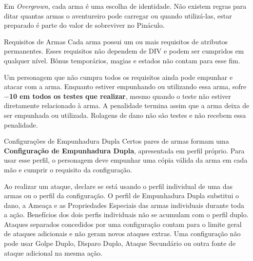 
Em \textit{Overgrown}, cada arma é uma escolha de identidade.
Não existem regras para ditar quantas armas o aventureiro pode carregar ou quando utilizá-las, estar preparado
é parte do valor de sobreviver no Pináculo.

\begin{rpgboxtips}{Requisitos de Armas}
Cada arma possui um ou mais requisitos de atributos permanentes. Esses requisitos não dependem de DIV e podem ser cumpridos em qualquer nível. Bônus temporários, magias e estados não contam para esse fim.

Um personagem que não cumpra todos os requisitos ainda pode empunhar e atacar com a arma. Enquanto estiver empunhando ou utilizando essa arma, sofre \textbf{$-$10 em todos os testes que realizar}, mesmo quando o teste não estiver diretamente relacionado à arma. A penalidade termina assim que a arma deixa de ser empunhada ou utilizada. Rolagens de dano não são testes e não recebem essa penalidade.
\end{rpgboxtips}

\begin{rpgboxtips}{Configurações de Empunhadura Dupla}
Certos pares de armas formam uma \textbf{Configuração de Empunhadura Dupla}, apresentada em perfil próprio. Para usar esse perfil, o personagem deve empunhar uma cópia válida da arma em cada mão e cumprir o requisito da configuração.

Ao realizar um ataque, declare se está usando o perfil individual de uma das armas ou o perfil da configuração. O perfil de Empunhadura Dupla substitui o dano, a Ameaça e as Propriedades Especiais das armas individuais durante toda a ação. Benefícios dos dois perfis individuais não se acumulam com o perfil duplo. Ataques separados concedidos por uma configuração contam para o limite geral de ataques adicionais e não geram novos ataques extras. Uma configuração não pode usar Golpe Duplo, Disparo Duplo, Ataque Secundário ou outra fonte de ataque adicional na mesma ação.
\end{rpgboxtips}


